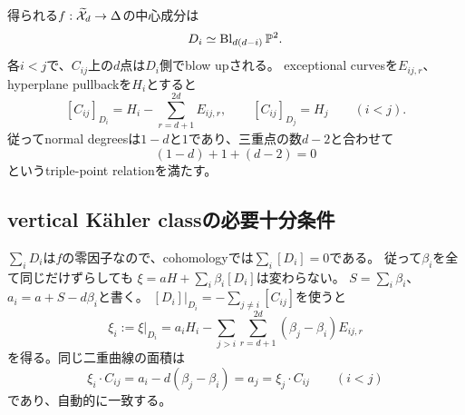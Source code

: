 得られる$f:\widetilde{\mathcal X}_d\to\Delta$の中心成分は
\begin{equation}\label{deg:components}
D_i\simeq\operatorname{Bl}_{d(d-i)}\mathbb P^2.
\end{equation}
各$i<j$で、$C_{ij}$上の$d$点は$D_i$側でblow upされる。
exceptional curvesを$E_{ij,r}$、hyperplane pullbackを$H_i$とすると
\begin{equation}\label{deg:double-classes}
[C_{ij}]_{D_i}=H_i-\sum_{r=d+1}^{2d}E_{ij,r},\qquad
[C_{ij}]_{D_j}=H_j\qquad(i<j).
\end{equation}
従ってnormal degreesは$1-d$と$1$であり、三重点の数$d-2$と合わせて
\[
(1-d)+1+(d-2)=0
\]
というtriple-point relationを満たす。

\subsection{vertical Kähler classの必要十分条件}
$\sum_iD_i$は$f$の零因子なので、cohomologyでは$\sum_i[D_i]=0$である。
従って$\beta_i$を全て同じだけずらしても
$\xi=aH+\sum_i\beta_i[D_i]$は変わらない。
$S=\sum_i\beta_i$、$a_i=a+S-d\beta_i$と書く。
$[D_i]|_{D_i}=-\sum_{j\ne i}[C_{ij}]$を使うと
\begin{equation}\label{pol:restriction}
\xi_i:=\xi|_{D_i}
=a_iH_i-\sum_{j>i}\sum_{r=d+1}^{2d}(\beta_j-\beta_i)E_{ij,r}
\end{equation}
を得る。同じ二重曲線の面積は
\begin{equation}\label{pol:area-match}
\xi_i\cdot C_{ij}=a_i-d(\beta_j-\beta_i)=a_j
=\xi_j\cdot C_{ij}\qquad(i<j)
\end{equation}
であり、自動的に一致する。

